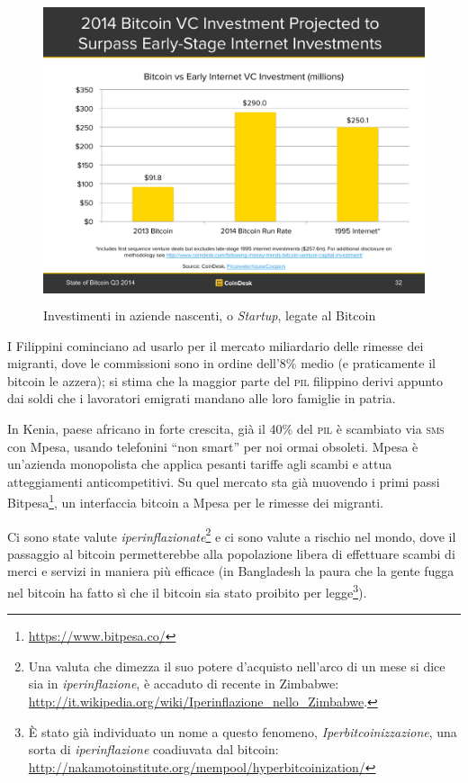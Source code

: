 \documentclass[a4paper,12pt,italian]{article}
\begin{document}
\begin{figure}
\centering
\includegraphics[width=15.649cm,height=8.954cm]{figures/vc.pdf}
\caption{Investimenti in aziende nascenti, o \emph{Startup}, legate al Bitcoin}
\end{figure}

\bigskip

I Filippini cominciano ad usarlo per il mercato miliardario delle
rimesse dei migranti, dove le commissioni sono in ordine dell’8\% medio
(e praticamente il bitcoin le azzera); si stima che la maggior parte
del \textsc{pil} filippino derivi appunto dai soldi che i lavoratori emigrati
mandano alle loro famiglie in patria.

\bigskip

In Kenia, paese africano in forte crescita, già il 40\% del \textsc{pil} è
scambiato via \textsc{sms} con Mpesa, usando telefonini “non smart” per noi
ormai obsoleti. Mpesa è un’azienda monopolista che applica pesanti
tariffe agli scambi e attua atteggiamenti anticompetitivi. Su quel
mercato sta già muovendo i primi passi
Bitpesa\footnote{\url{https://www.bitpesa.co/}}, un interfaccia bitcoin a
Mpesa per le rimesse dei migranti.


\bigskip

Ci sono state valute \emph{iperinflazionate}\footnote{Una valuta che dimezza
il suo potere d'acquisto nell'arco di un mese si dice sia in \emph{iperinflazione}, è
accaduto di recente in Zimbabwe: \url{http://it.wikipedia.org/wiki/Iperinflazione_nello_Zimbabwe}.}
e ci sono valute a rischio nel mondo, dove il passaggio al bitcoin
permetterebbe alla popolazione libera di effettuare scambi di merci e
servizi in maniera più efficace (in Bangladesh la paura che la gente
fugga nel bitcoin ha fatto sì che il bitcoin sia stato proibito per
legge\footnote{È stato già individuato un nome a questo fenomeno, \emph{Iperbitcoinizzazione}, una sorta di \emph{iperinflazione}
coadiuvata dal bitcoin: \url{http://nakamotoinstitute.org/mempool/hyperbitcoinization/}}).
\end{document}
